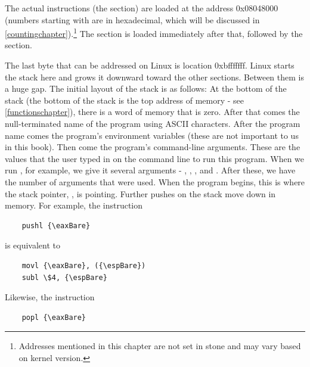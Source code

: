 The actual instructions (the  section) are loaded at the 
address 0x08048000 (numbers starting with  are in hexadecimal, which
will be discussed in \autoref{countingchapter}).\footnote{Addresses mentioned in this chapter are not set in stone and may vary based on kernel 
version.}  The 
section is loaded immediately after that, followed by the 
section.

The last byte that can be addressed on Linux is location
0xbfffffff.  Linux starts the stack here and grows
it downward toward the other sections.  Between them is a huge 
gap.  The initial layout of the stack is as follows:
At the bottom of the stack (the bottom of the stack is the
top address of memory - see \autoref{functionschapter}),
there is a word of memory that is
zero.  After that comes the null-terminated 
name of the program using ASCII characters.
After the program name comes the program's environment variables (these
are not important to us in this book).  Then come the program's command-line arguments.
These are the values that the user typed in on the command line
to run this program.  When we run ,
for example, we give it several arguments - ,
, , and 
.  After these, we have the 
number of arguments that were used.  When the program begins,
this is where the stack pointer, {\espRegIdx}, is pointing.  
Further pushes on the stack move {\espReg} down in memory.  For example,
the instruction

\begin{simpletyping}
\begin{lstlisting}
	pushl {\eaxBare}
\end{lstlisting}
\end{simpletyping}

is equivalent to

\begin{simpletyping}
\begin{lstlisting}
	movl {\eaxBare}, ({\espBare})
	subl \$4, {\espBare}
\end{lstlisting}
\end{simpletyping}

Likewise, the instruction

\begin{simpletyping}
\begin{lstlisting}
	popl {\eaxBare}
\end{lstlisting}
\end{simpletyping}

